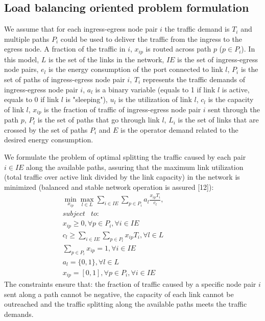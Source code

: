 \documentclass[journal]{IEEEtran}
\begin{document}
\subsection{Load balancing oriented problem formulation}
We assume that for each ingress-egress node pair \(i\) the traffic demand is \(T_i\) and multiple paths \(P_i\) could be used to deliver the traffic from the ingress to the egress node. A fraction of the traffic in \(i\), \(x_{ip}\) is routed across path \(p\) (\(p \in P_i\)). In this model, \(L\) is the set of the links in the network, \(IE\) is the set of ingress-egress node pairs, \(e_l\) is the energy consumption of the port connected to link \(l\), \(P_i\) is the set of paths of ingress-egress node pair \(i\), \(T_i\) represents the traffic demands of ingress-egress node pair \(i\), \(a_l\) is a binary variable (equals to 1 if link \(l\) is active, equals to 0 if link \(l\) is "sleeping"), \(u_l\) is the utilization of link \(l\), \(c_l\) is the capacity of link \(l\), \(x_{ip}\) is the fraction of traffic of ingress-egress node pair \(i\) sent through the path \(p\), \(P_l\) is the set of paths that go through link \(l\), \(L_i\) is the set of links that are crossed by the set of paths \(P_i\) and \(E\) is the operator demand related to the desired energy consumption.

We formulate the problem of optimal splitting the traffic caused by each pair \(i \in IE\) along the available paths, assuring that the maximum link utilization (total traffic over active link divided by the link capacity) in the network is minimized (balanced and stable network operation is assured [12]):
\[\begin{array}{c}
\mathop {\min }\limits_{{x_{ip}}} \mathop {\max }\limits_{l \in L} \sum\limits_{i \in IE} {\sum\limits_{p \in {P_i}} {{a_l}\frac{{{x_{ip}}{T_i}}}{{{c_l}}},} } \\
subject\begin{array}{*{20}{c}}
{}
\end{array}to:\begin{array}{*{20}{c}}
{}&{}&{}&{}&{}&{}&{}&{}&{}&{}&{}&{}&{}&{}&{}&{}&{}&{}
\end{array}\\
{x_{ip}} \ge 0,\forall p \in {P_i},\forall i \in IE\\
{c_l} \ge \sum\limits_{i \in IE} {\sum\limits_{p \in {P_l}} {{x_{ip}}{T_i},\forall l \in L} } \\
\sum\limits_{p \in {P_i}} {{x_{ip}} = 1,} \forall i \in IE\\
{a_l} = \{ 0,1\} ,\forall l \in L\\
{x_{ip}} = [0,1],\forall p \in {P_i},\forall i \in IE
\end{array}\]
The constraints ensure that: the fraction of traffic caused by a specific node pair \(i\) sent along a path cannot be negative, the capacity of each link cannot be outreached and the traffic splitting along the available paths meets the traffic demands.
\end{document}
